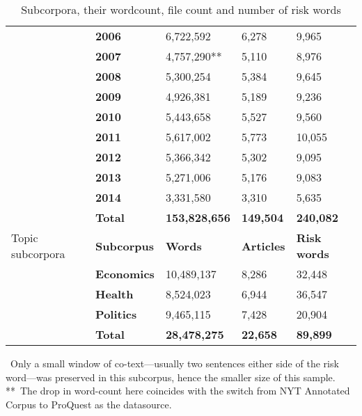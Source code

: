 \begin{table}
\begin{tabular}{p{1.5cm}|l|l|l|l|}
~ & \textbf{2006} & 6,722,592 & 6,278 &  9,965  \\ \cline{2-5}
~ & \textbf{2007} & 4,757,290** & 5,110 &  8,976  \\ \cline{2-5}
~ & \textbf{2008} & 5,300,254 & 5,384 &  9,645  \\ \cline{2-5}
~ & \textbf{2009} & 4,926,381 & 5,189 &  9,236  \\ \cline{2-5}
~ & \textbf{2010} & 5,443,658 & 5,527 &  9,560  \\ \cline{2-5}
~ & \textbf{2011} & 5,617,002 & 5,773 & 10,055  \\ \cline{2-5}
~ & \textbf{2012} & 5,366,342 & 5,302 &  9,095  \\ \cline{2-5}
~ & \textbf{2013} & 5,271,006 & 5,176 &  9,083  \\ \cline{2-5}
~ & \textbf{2014} & 3,331,580 & 3,310 &  5,635 \\ \cline{2-5}
~ & \textbf{Total} & \textbf{153,828,656} & \textbf{149,504} & \textbf{240,082} \\ \hline
\multicolumn{1}{|p{1.5cm}|}{Topic \mbox{subcorpora}} & \textbf{Subcorpus} & \textbf{Words} & \textbf{Articles} & \textbf{Risk words}   \\ \hline
~ & \textbf{Economics} & 10,489,137 & 8,286 & 32,448 \\ \cline{2-5}
~ & \textbf{Health}    & 8,524,023  & 6,944 & 36,547 \\ \cline{2-5}
~ & \textbf{Politics}  & 9,465,115  & 7,428 & 20,904 \\ \cline{2-5}
~ & \textbf{Total} & \textbf{28,478,275} & \textbf{22,658} & \textbf{89,899} \\ \cline{2-5}
\end{tabular}
    \caption{Subcorpora, their wordcount, file count and number of risk words}
    \label{tab:stats}
    \medskip %
\begin{minipage}{0.9\textwidth} %
{\footnotesize *~Only a small window of co-text---usually two sentences either side of the risk word---was preserved in this subcorpus, hence the smaller size of this sample.~\\
**~The drop in word-count here coincides with the switch from NYT Annotated Corpus to ProQuest as the datasource.\par}
\end{minipage}
\end{table}


